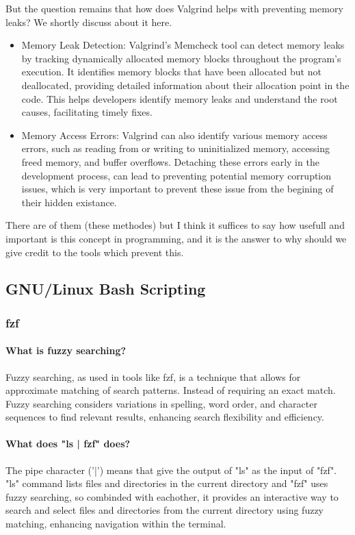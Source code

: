 \documentclass{article}
\begin{document}
	But the question remains that how does Valgrind helps with preventing memory leaks? We shortly discuss about it here.

	\begin{itemize}

		\item Memory Leak Detection:
		Valgrind's Memcheck tool can detect memory leaks by tracking dynamically allocated memory blocks throughout the program's execution.
		It identifies memory blocks that have been allocated but not deallocated, providing detailed information about their allocation point in the code.
		This helps developers identify memory leaks and understand the root causes, facilitating timely fixes.

		\item Memory Access Errors:
		Valgrind can also identify various memory access errors, such as reading from or writing to uninitialized memory, accessing freed memory, and buffer overflows. Detaching these errors early in the development process, can lead to preventing potential memory corruption issues, which is very important to prevent these issue from the begining of their hidden existance.

	\end{itemize}

	There are of them (these methodes) but I think it suffices to say how usefull and important is this concept in programming, and it is the answer to why should we give credit to the tools which prevent this.


	\subsection{GNU/Linux Bash Scripting}
	\subsubsection{fzf}
	\paragraph{What is fuzzy searching?}
	Fuzzy searching, as used in tools like fzf, is a technique that allows for approximate matching of search patterns. Instead of requiring an exact match.
	Fuzzy searching considers variations in spelling, word order, and character sequences to find relevant results, enhancing search flexibility and efficiency.

	\paragraph{What does "ls | fzf" does?}
	The pipe character ('|') means that give the output of "ls" as the input of "fzf".
	"ls" command lists files and directories in the current directory
	and "fzf" uses fuzzy searching, so combinded with eachother,
	it provides an interactive way to search and select files and directories from the current directory using fuzzy matching, enhancing navigation within the terminal.
\end{document}

